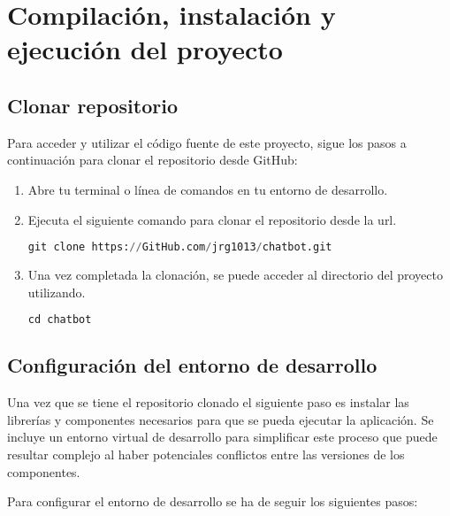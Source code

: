 \section{Compilación, instalación y ejecución del proyecto}\label{Instalación}

\subsection{Clonar repositorio}

Para acceder y utilizar el código fuente de este proyecto, sigue los pasos a continuación para clonar el repositorio desde GitHub:

\begin{enumerate}
\item Abre tu terminal o línea de comandos en tu entorno de desarrollo.

\item Ejecuta el siguiente comando para clonar el repositorio desde la \acrshort{url}.

\begin{lstlisting}[language=Python, caption=Clonar repositorio de GitHub. ]
    git clone https://GitHub.com/jrg1013/chatbot.git
\end{lstlisting}

\item Una vez completada la clonación, se puede acceder al directorio del proyecto utilizando.

\begin{lstlisting}[language=Python, caption=Acceso a la carpeta del proyecto.]
    cd chatbot
\end{lstlisting}     
\end{enumerate}

\subsection{Configuración del entorno de desarrollo}

Una vez que se tiene el repositorio clonado el siguiente paso es instalar las librerías y componentes necesarios para que se pueda ejecutar la aplicación. Se incluye un entorno virtual de desarrollo para simplificar este proceso que puede resultar complejo al haber potenciales conflictos entre las versiones de los componentes. 

Para configurar el entorno de desarrollo se ha de seguir los siguientes pasos:

